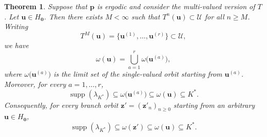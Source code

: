 \documentclass[11pt,reqno,tbtags,a4paper]{amsart}
\numberwithin{equation}{section}
\renewcommand\ge{\geq}
\renewcommand\geq{\geqslant}
\theoremstyle{plain}%
\newtheorem{theorem}{Theorem}[section]
\theoremstyle{definition}
\theoremstyle{remark}
\newcommand\supp{\operatorname{supp}}
\newcommand\gl{\lambda}
\newcommand\cL{{\omega}}
\newcommand\cU{{\mathcal U}}
\newcommand\Ho{H_{\0}}
\newcommand\vp{\mathbf{p}}
\newcommand\vu{\mathbf{u}}
\newcommand\vz{\mathbf{z}}
\newcommand\Kx{K^*}
\newcommand\0{{\boldsymbol 0}}
\newcommand\1{{\boldsymbol 1}}
\begin{document}
\begin{theorem}\label{TsupportK}
Suppose that $\vp$ is ergodic and consider the multi-valued version of $T$.
Let $\vu\in\Ho$. Then there exists $M<\infty$ such that $T^n(\vu)\subset \cU$
for all $n\ge M$. Writing
\begin{equation}\label{ts1}
T^M(\vu)=\{\vu^{(1)},\dots,\vu^{(r)}\}\subset \cU,
\end{equation}
we have
\begin{equation}\label{ts2}
\cL(\vu)=\bigcup_{a=1}^r \omega\bigl(\vu^{(a)}\bigr),
\end{equation}
where $\omega\bigl(\vu^{(a)}\bigr)$ is the limit set
of the single-valued orbit starting from $\vu^{(a)}$.
%
Moreover, for every $a=1,\dots,r$,
\begin{equation}\label{ts3}
\supp(\gl_{\Kx})
\subseteq
\omega\bigl(\vu^{(a)}\bigr)
\subseteq
\cL(\vu)
\subseteq
\Kx.
\end{equation}
Consequently, for every branch orbit $\vz'=(\vz'_n)_{n\ge0}$ starting from
an arbitrary $\vu\in\Ho$,
\begin{equation}\label{ts4}
\supp(\gl_{\Kx})
\subseteq
\omega(\vz')
\subseteq
\cL(\vu)
\subseteq
\Kx.
\end{equation}
\end{theorem}
\end{document}

